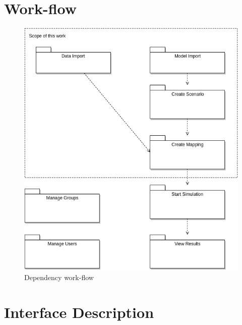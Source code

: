 \section{Work-flow}

\begin{figure}[H]
	\centering\includegraphics[width=.7\textwidth]{res/Dependency-workflow}
	\caption{Dependency work-flow}
	\label{fig:dependency-workflow}
\end{figure}



\section{Interface Description}
